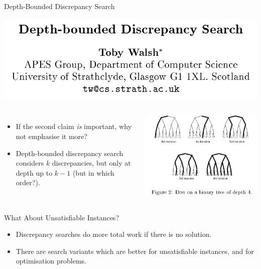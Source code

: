 \documentclass{beamer}
\begin{document}
\begin{frame}{Depth-Bounded Discrepancy Search}

    \centering\includegraphics*[keepaspectratio=true,scale=0.2]{dds-paper.png}
    \vspace{1em}

    \begin{columns}[T]
        \begin{itemize}
            \item If the second claim \emph{is} important, why not emphasise it more?

            \item Depth-bounded discrepancy search considers $k$ discrepancies, but only at depth up
                to $k - 1$ (but in which order?).
        \end{itemize}
        \centering\includegraphics*[keepaspectratio=true,scale=0.2]{dds-tree.png}
    \end{columns}

\end{frame}

\begin{frame}{What About Unsatisfiable Instances?}

    \begin{itemize}
        \item Discrepancy searches do more total work if there is no solution.

        \item There are search variants which are better for unsatisfiable instances, and for
            optimisation problems.
    \end{itemize}

\end{frame}
\end{document}
